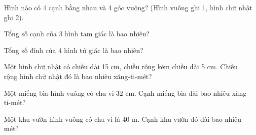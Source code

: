 \begin{ex}
Hình nào có 4 cạnh bằng nhau và 4 góc vuông? (Hình vuông ghi 1, hình chữ nhật ghi 2).
\end{ex}

\begin{ex}
Tổng số cạnh của 3 hình tam giác là bao nhiêu?
\end{ex}

\begin{ex}
Tổng số đỉnh của 4 hình tứ giác là bao nhiêu?
\end{ex}

\begin{ex}
Một hình chữ nhật có chiều dài 15 cm, chiều rộng kém chiều dài 5 cm. Chiều rộng hình chữ nhật đó là bao nhiêu xăng-ti-mét?
\end{ex}

\begin{ex}
Một miếng bìa hình vuông có chu vi 32 cm. Cạnh miếng bìa dài bao nhiêu xăng-ti-mét?
\end{ex}

\begin{ex}
Một khu vườn hình vuông có chu vi là 40 m. Cạnh khu vườn đó dài bao nhiêu mét?
\end{ex}
